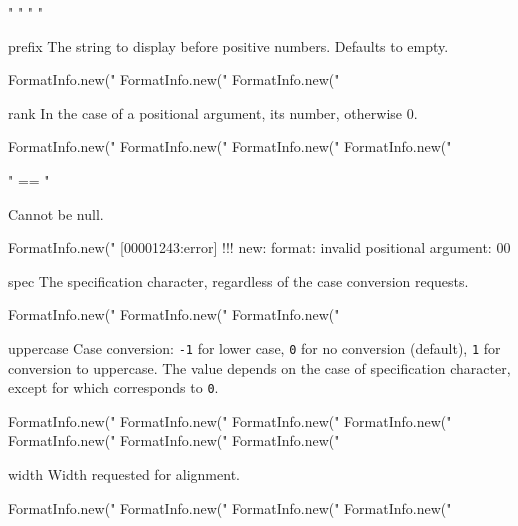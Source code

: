 \begin{urbiscriptapi}
\begin{urbiassert}
  "%
"%
"%
"%
\end{urbiassert}


\item[prefix]
  The string to display before positive numbers.  Defaults to empty.
\begin{urbiassert}
FormatInfo.new("%
FormatInfo.new("%
FormatInfo.new("%
\end{urbiassert}


\item[rank]%
  In the case of a positional argument, its number, otherwise 0.
\begin{urbiassert}
FormatInfo.new("%
FormatInfo.new("%
FormatInfo.new("%
FormatInfo.new("%

 "%
  == "%
\end{urbiassert}
Cannot be null.
\begin{urbiscript}
FormatInfo.new("%
[00001243:error] !!! new: format: invalid positional argument: 00
\end{urbiscript}

\item[spec]
  The specification character, regardless of the case conversion
  requests.
\begin{urbiassert}
FormatInfo.new("%
FormatInfo.new("%
FormatInfo.new("%
\end{urbiassert}


\item[uppercase]
  Case conversion: \lstinline|-1| for lower case, \lstinline|0| for no
  conversion (default), \lstinline|1| for conversion to uppercase.
  The value depends on the case of specification character, except for
   which corresponds to \lstinline|0|.
\begin{urbiassert}
FormatInfo.new("%
FormatInfo.new("%
FormatInfo.new("%
FormatInfo.new("%
FormatInfo.new("%
FormatInfo.new("%
FormatInfo.new("%
\end{urbiassert}


\item[width]
  Width requested for alignment.
\begin{urbiassert}
FormatInfo.new("%
FormatInfo.new("%
FormatInfo.new("%
FormatInfo.new("%
\end{urbiassert}
\end{urbiscriptapi}


